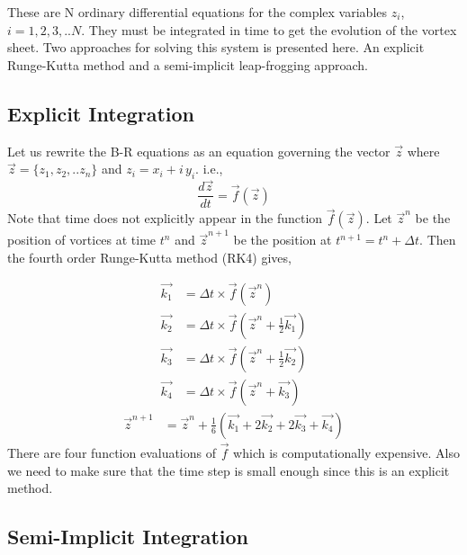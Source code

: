 \documentclass{article}
\begin{document}
These are N ordinary differential equations for the complex variables $z_i$, $i=1,2,3,..N$. They must be integrated in time to get the evolution of the vortex sheet. Two approaches for solving this system is presented here. An explicit Runge-Kutta method and a semi-implicit leap-frogging approach.

\subsection{Explicit Integration}
Let us rewrite the B-R equations as an equation governing the vector $\vec{z}$ where $\vec{z}=\lbrace z_1,z_2,..z_n\rbrace$ and $z_i=x_i+i\,y_i$. i.e.,
\begin{equation}
\frac{d\vec{z}}{dt}=\vec{f}(\vec{z})
\end{equation}
Note that time does not explicitly appear in the function $\vec{f}(\vec{z})$. Let $\overrightarrow{z}^n$ be the position of vortices at time $t^n$ and $\overrightarrow{z}^{n+1}$ be the position at $t^{n+1}=t^n+\Delta t$. Then the fourth order Runge-Kutta method (RK4) gives,


\begin{align*}
\overrightarrow{k_1}&=\Delta t \times\vec{f}\left(\overrightarrow{z}^n\right) \\
\overrightarrow{k_2}&=\Delta t \times\vec{f}\left(\overrightarrow{z}^n+\frac{1}{2}\overrightarrow{k_1}\right) \\
\overrightarrow{k_3}&=\Delta t \times\vec{f}\left(\overrightarrow{z}^n+\frac{1}{2}\overrightarrow{k_2}\right) \\
\overrightarrow{k_4}&=\Delta t \times\vec{f}\left(\overrightarrow{z}^n+\overrightarrow{k_3}\right)
\end{align*}
\begin{align}
\overrightarrow{z}^{n+1}&=\overrightarrow{z}^n+\frac{1}{6}\left(\overrightarrow{k_1}+2\overrightarrow{k_2}+2\overrightarrow{k_3}+\overrightarrow{k_4}\right)
\end{align}
There are four function evaluations of $\vec{f}$ which is computationally expensive. Also we need to make sure that the time step is small enough since this is an explicit method. 

\subsection{Semi-Implicit Integration}
\end{document}
